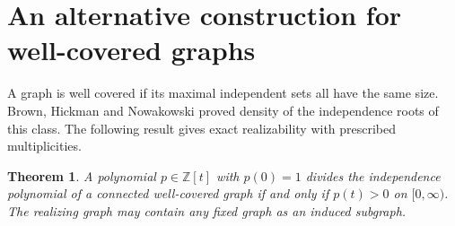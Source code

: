 \documentclass[11pt,a4paper]{article}
\newtheorem{theorem}{Theorem}[section]
\begin{document}
\appendix
\section{An alternative construction for well-covered graphs}
\label{sec:well-covered}
A graph is well covered if its maximal independent sets all have the same
size. Brown, Hickman and Nowakowski \cite{brown2004} proved density of the
independence roots of this class. The following result gives exact
realizability with prescribed multiplicities.

\begin{theorem}\label{thm:well-covered}
A polynomial $p\in\mathbb Z[t]$ with $p(0)=1$ divides the independence
polynomial of a connected well-covered graph if and only if $p(t)>0$
on $[0,\infty)$. The realizing graph may contain any fixed graph as an
induced subgraph.
\end{theorem}
\end{document}
